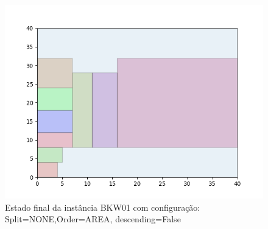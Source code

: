 \begin{figure}[H]
    \centering
    \caption[]{Estado final da instância BKW01 com configuração: Split=NONE,Order=AREA, descending=False}
    \label{fig:bkw01-none-area-false}
    \includegraphics[scale=0.5]{output/figures/bkw/bkw01/none/area/false/00}
\end{figure}
